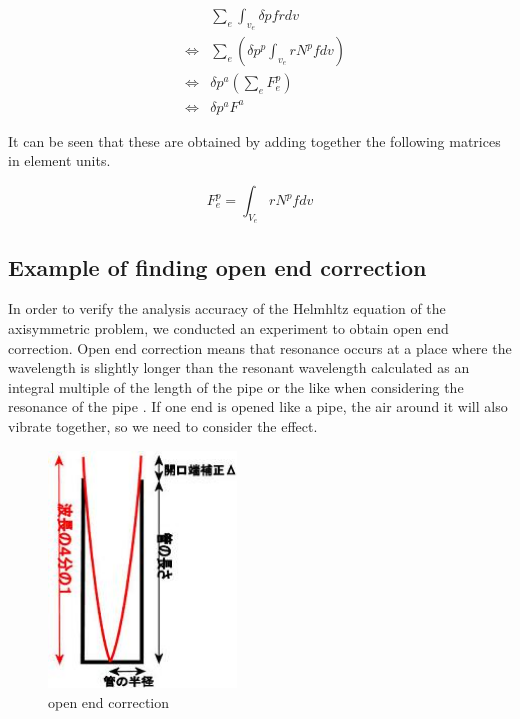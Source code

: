\begin{eqnarray}
&& \sum_e\int_{v_e} \delta p f rdv\\
&\Leftrightarrow& \sum_e\left(\delta p^p\int_{v_e}r N^p f dv\right)\\
&\Leftrightarrow& \delta p^a\left(\sum_e F^p_e \right)\\
&\Leftrightarrow& \delta p^a F^a
\end{eqnarray}

It can be seen that these are obtained by adding together the following matrices in element units.

\begin{tcolorbox}[title=external force vector]
\begin{equation}
F_e^p = \int_{V_e} rN^p f dv
\end{equation}
\end{tcolorbox}

\subsection{Example of finding open end correction}
In order to verify the analysis accuracy of the Helmhltz equation of the axisymmetric problem, we conducted an experiment to obtain open end correction. Open end correction means that resonance occurs at a place where the wavelength is slightly longer than the resonant wavelength calculated as an integral multiple of the length of the pipe or the like when considering the resonance of the pipe . If one end is opened like a pipe, the air around it will also vibrate together, so we need to consider the effect.

\begin{figure}[tbp]
\begin{center}
\includegraphics[bb=0 0 150 150,width=5cm]{images/open_end_modify.jpg}
\caption{open end correction}
\end{center}
\end{figure}




